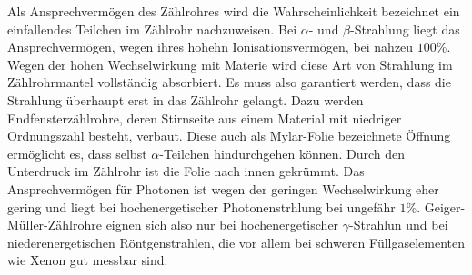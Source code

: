 Als Ansprechvermögen des Zählrohres wird die Wahrscheinlichkeit bezeichnet ein einfallendes Teilchen im Zählrohr nachzuweisen. Bei $\alpha$- und $\beta$-Strahlung liegt das Ansprechvermögen, wegen ihres hohehn Ionisationsvermögen, bei nahzeu $100\%$.
Wegen der hohen Wechselwirkung mit Materie wird diese Art von Strahlung im Zählrohrmantel vollständig absorbiert. Es muss also garantiert werden, dass die Strahlung überhaupt erst in das Zählrohr gelangt. Dazu werden Endfensterzählrohre, deren Stirnseite aus einem
Material mit niedriger Ordnungszahl besteht, verbaut. Diese auch als Mylar-Folie bezeichnete Öffnung ermöglicht es, dass selbst $\alpha$-Teilchen hindurchgehen können. Durch den Unterdruck im Zählrohr ist die Folie nach innen gekrümmt. \newline
Das Ansprechvermögen für Photonen ist wegen der geringen Wechselwirkung eher gering und liegt bei hochenergetischer Photonenstrhlung bei ungefähr $1\%$. Geiger-Müller-Zählrohre eignen sich also nur bei hochenergetischer $\gamma$-Strahlun und bei niederenergetischen Röntgenstrahlen, die vor allem bei schweren Füllgaselementen
wie Xenon gut messbar sind.
